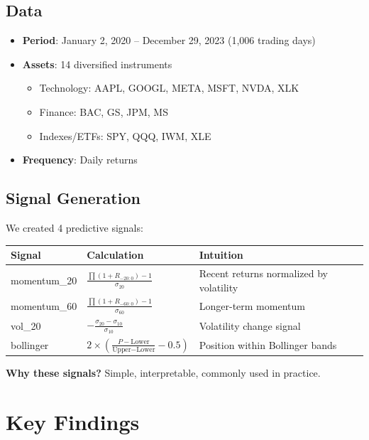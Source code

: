 \documentclass[a4paper,12pt]{article}
\begin{document}
\subsection{Data}

\begin{itemize}
    \item \textbf{Period}: January 2, 2020 – December 29, 2023 (1,006 trading days)
    \item \textbf{Assets}: 14 diversified instruments
    \begin{itemize}
        \item Technology: AAPL, GOOGL, META, MSFT, NVDA, XLK
        \item Finance: BAC, GS, JPM, MS
        \item Indexes/ETFs: SPY, QQQ, IWM, XLE
    \end{itemize}
    \item \textbf{Frequency}: Daily returns
\end{itemize}

\subsection{Signal Generation}

We created 4 predictive signals:

\begin{table}[H]
\centering
\begin{tabular}{lll}
\toprule
\textbf{Signal} & \textbf{Calculation} & \textbf{Intuition} \\
\midrule
momentum\_20 & $\frac{\prod(1+R_{-20:0})-1}{\sigma_{20}}$ & Recent returns normalized by volatility \\
momentum\_60 & $\frac{\prod(1+R_{-60:0})-1}{\sigma_{60}}$ & Longer-term momentum \\
vol\_20 & $-\frac{\sigma_{20} - \sigma_{10}}{\sigma_{10}}$ & Volatility change signal \\
bollinger & $2 \times (\frac{P - \text{Lower}}{\text{Upper} - \text{Lower}} - 0.5)$ & Position within Bollinger bands \\
\bottomrule
\end{tabular}
\end{table}

\textbf{Why these signals?} Simple, interpretable, commonly used in practice.

\section{Key Findings}
\end{document}
